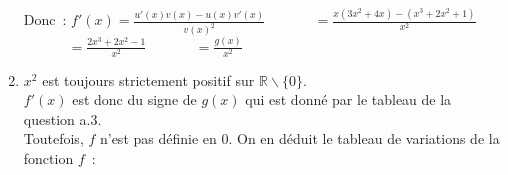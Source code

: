 \begin{corrige}
\begin{enumerate}
          \newpar
          Donc~:
          \newpar
          $ f'  (x) = \frac{ u'  (x) v (x)  - u (x) v'  (x)  }{ v (x) ^2  }  $
          \newpar
          $\phantom{ f'  (x) } =  \frac{ x (3x^2 +4x)  -  (x^{ 3 } +2x^2 +1)  }{  x^2  } $
          \newpar
          $\phantom{ f'  (x) } =  \frac{ 2x^{ 3 } +2x^2  - 1 }{  x^2  } $
          \newpar
          $\phantom{ f'  (x) } =  \frac{ g (x)  }{  x^2  } $
          \item
          $ x^2  $ est toujours strictement positif sur $  \mathbb{R} \backslash \{ 0 \}. $  \\
          $ f'  (x)  $ est donc du signe de  $ g (x)  $ qui est donné par le tableau de la question a.3. \\
          Toutefois, $ f $ n'est pas définie en $ 0. $
          \newpar
          On en déduit le tableau de variations de la fonction $ f $~:
          \begin{center}
               \begin{extern}%
\end{extern}
\end{center}
\end{enumerate}
\end{corrige}
